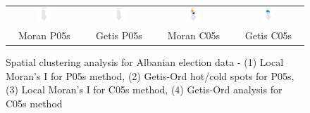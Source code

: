 \documentclass{article}
\begin{document}
\begin{figure}[h]
\centering
\begin{tabular}{cccc}
\includegraphics[width=0.22\textwidth]{inst/figures/img5.png} &
\includegraphics[width=0.22\textwidth]{inst/figures/img6.png} &
\includegraphics[width=0.22\textwidth]{inst/figures/img7.png} &
\includegraphics[width=0.22\textwidth]{inst/figures/img8.png} \\
Moran P05s & Getis P05s & Moran C05s & Getis C05s \\
\end{tabular}
\caption{Spatial clustering analysis for Albanian election data - (1) Local Moran's I for P05s method, (2) Getis-Ord hot/cold spots for P05s, (3) Local Moran's I for C05s method, (4) Getis-Ord analysis for C05s method}
\end{figure}
\end{document}
